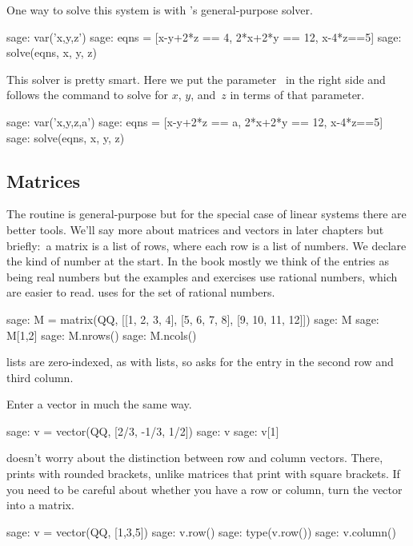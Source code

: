 One way to solve this system is with \Sage's general-purpose solver.
\begin{sagecommandline}
sage: var('x,y,z')                                  
sage: eqns = [x-y+2*z == 4, 2*x+2*y == 12, x-4*z==5]
sage: solve(eqns, x, y, z)                            
\end{sagecommandline}
This solver is pretty smart.
Here we put the parameter~ in the right side 
and \Sage{} follows the
command  to 
solve for $x$, $y$, and~$z$ in terms of that parameter.
\begin{sagecommandline}
sage: var('x,y,z,a')                                
sage: eqns = [x-y+2*z == a, 2*x+2*y == 12, x-4*z==5]
sage: solve(eqns, x, y, z) 
\end{sagecommandline}



\subsection{Matrices}
The  routine is general-purpose but 
for the special case of linear systems there are better tools.
We'll say more about matrices and vectors in later chapters but 
briefly:~a \Sage{} matrix is a list of rows, where
each row is a list of numbers. 
We declare the kind of number at the start.
In the book mostly we think of the entries as being real numbers
but the examples and exercises use rational numbers, which are
easier to read.
\Sage{} uses  for the set of rational numbers.
\begin{sagecommandline}
sage: M = matrix(QQ, [[1, 2, 3, 4], [5, 6, 7, 8], [9, 10, 11, 12]])
sage: M
sage: M[1,2]
sage: M.nrows()
sage: M.ncols()
\end{sagecommandline}
\Sage{} lists are zero-indexed, as with \python{} lists, 
so  asks
for the entry in the second row and third column. 

Enter a vector in much the same way.
\begin{sagecommandline}
sage: v = vector(QQ, [2/3, -1/3, 1/2])
sage: v
sage: v[1]
\end{sagecommandline}
\Sage{} doesn't worry about the distinction between row and column
vectors.
There,  prints with rounded brackets, unlike matrices
that print with square brackets.
If you need to be careful about whether you have a row or column, turn the 
vector into a matrix.
\begin{sagecommandline}
sage: v = vector(QQ, [1,3,5])
sage: v.row()
sage: type(v.row())
sage: v.column()
\end{sagecommandline}

